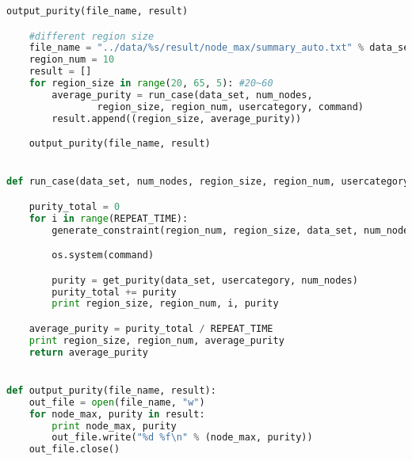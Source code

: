 \begin{lstlisting}[language={python}, caption={自动化脚本}, label=code:auto]
    output_purity(file_name, result)

    #different region size
    file_name = "../data/%s/result/node_max/summary_auto.txt" % data_set
    region_num = 10
    result = []
    for region_size in range(20, 65, 5): #20~60
        average_purity = run_case(data_set, num_nodes,
                region_size, region_num, usercategory, command)
        result.append((region_size, average_purity))

    output_purity(file_name, result)


def run_case(data_set, num_nodes, region_size, region_num, usercategory, command):

    purity_total = 0
    for i in range(REPEAT_TIME):
        generate_constraint(region_num, region_size, data_set, num_nodes)

        os.system(command)

        purity = get_purity(data_set, usercategory, num_nodes)
        purity_total += purity
        print region_size, region_num, i, purity

    average_purity = purity_total / REPEAT_TIME
    print region_size, region_num, average_purity
    return average_purity


def output_purity(file_name, result):
    out_file = open(file_name, "w")
    for node_max, purity in result:
        print node_max, purity
        out_file.write("%d %f\n" % (node_max, purity))
    out_file.close()
\end{lstlisting}
